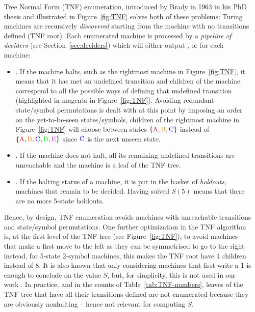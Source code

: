 Tree Normal Form (TNF) enumeration, introduced by Brady in 1963 in his PhD thesis \cite{Brady64} and illustrated in Figure~\ref{fig:TNF} solves both of these problems: Turing machines are recursively \textit{discovered} starting from the machine with no transitions defined (TNF root). Each enumerated machine is processed by a \textit{pipeline of deciders} (see Section~\ref{sec:deciders}) which will either output \HALT, \NONHALT or \UNKNOWN for each machine:
\begin{itemize}
    \item \HALT. If the machine halts, such as the rightmost machine in Figure~\ref{fig:TNF}, it means that it has met an undefined transition and children of the machine correspond to all the possible ways of defining that undefined transition (highlighted in magenta in Figure~\ref{fig:TNF}). Avoiding redundant state/symbol permutations is dealt with at this point by imposing an order on the yet-to-be-seen states/symbols, \eg children of the rightmost machine in Figure~\ref{fig:TNF} will choose between states $\{\text{\stateA},\text{\stateB},\text{\stateC}\}$ instead of $\{\text{\stateA},\text{\stateB},\text{\stateC},\text{\stateD},\text{\stateE}\}$ since $\text{\stateC}$ is the next unseen state.

    \item  \NONHALT. If the machine does not halt, all its remaining undefined transitions are unreachable and the machine is a leaf of the TNF tree.
    \item \UNKNOWN. If the halting status of a machine, it is put in the basket of \textit{holdouts}, \ie machines that remain to be decided. Having solved $S(5)$ means that there are no more 5-state holdouts.
\end{itemize}


Hence, by design, TNF enumeration avoids machines with unreachable transitions and state/symbol permutations. One further optimization in the TNF algorithm is,
at the first level of the TNF tree (see Figure~\ref{fig:TNF}), to avoid machines that make a first move to the left as they can be symmetrised to go to the right instead, \eg for 5-state 2-symbol machines, this makes the TNF root have 4 children instead of 8. It is also known that only considering machines that first write a 1 is enough to conclude on the value $S$, but, for simplicity, this is not used in our work \cite{Marxen_1990,busycoq}. In practice, and in the counts of Table~\ref{tab:TNF-numbers}, leaves of the TNF tree that have all their transitions defined are not enumerated because they are obviously nonhalting -- hence not relevant for computing $S$.

